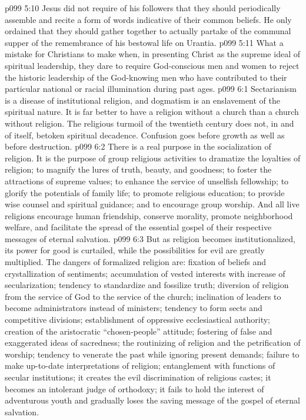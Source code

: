 \vs p099 5:10 Jesus did not require of his followers that they should periodically assemble and recite a form of words indicative of their common beliefs. He only ordained that they should gather together to actually partake of the communal supper of the remembrance of his bestowal life on Urantia.
\pc \vs p099 5:11 What a mistake for Christians to make when, in presenting Christ as the supreme ideal of spiritual leadership, they dare to require God\hyp{}conscious men and women to reject the historic leadership of the God\hyp{}knowing men who have contributed to their particular national or racial illumination during past ages.
\vs p099 6:1 Sectarianism is a disease of institutional religion, and dogmatism is an enslavement of the spiritual nature. It is far better to have a religion without a church than a church without religion. The religious turmoil of the twentieth century does not, in and of itself, betoken spiritual decadence. Confusion goes before growth as well as before destruction.
\vs p099 6:2 There is a real purpose in the socialization of religion. It is the purpose of group religious activities to dramatize the loyalties of religion; to magnify the lures of truth, beauty, and goodness; to foster the attractions of supreme values; to enhance the service of unselfish fellowship; to glorify the potentials of family life; to promote religious education; to provide wise counsel and spiritual guidance; and to encourage group worship. And all live religions encourage human friendship, conserve morality, promote neighborhood welfare, and facilitate the spread of the essential gospel of their respective messages of eternal salvation.
\vs p099 6:3 But as religion becomes institutionalized, its power for good is curtailed, while the possibilities for evil are greatly multiplied. The dangers of formalized religion are: fixation of beliefs and crystallization of sentiments; accumulation of vested interests with increase of secularization; tendency to standardize and fossilize truth; diversion of religion from the service of God to the service of the church; inclination of leaders to become administrators instead of ministers; tendency to form sects and competitive divisions; establishment of oppressive ecclesiastical authority; creation of the aristocratic “chosen\hyp{}people” attitude; fostering of false and exaggerated ideas of sacredness; the routinizing of religion and the petrification of worship; tendency to venerate the past while ignoring present demands; failure to make up\hyp{}to\hyp{}date interpretations of religion; entanglement with functions of secular institutions; it creates the evil discrimination of religious castes; it becomes an intolerant judge of orthodoxy; it fails to hold the interest of adventurous youth and gradually loses the saving message of the gospel of eternal salvation.
